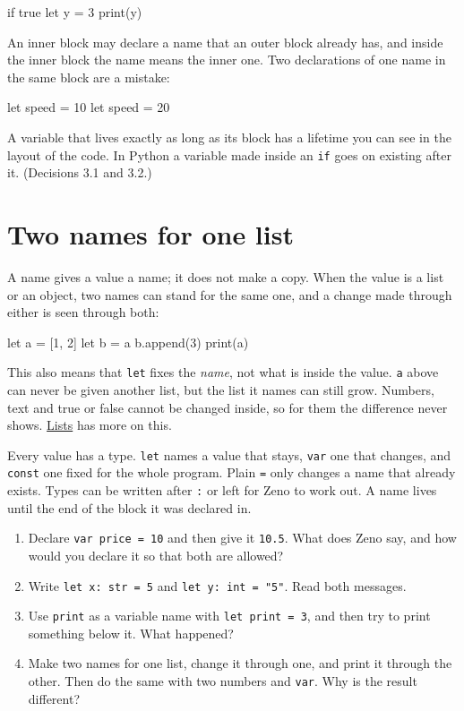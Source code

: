 \begin{zeno}[fails=yes]
if true {
    let y = 3
}
print(y)
\end{zeno}

An inner block may declare a name that an outer block already has,
and inside the inner block the name means the inner one. Two
declarations of one name in the same block are a mistake:

\begin{zeno}[fails=yes]
let speed = 10
let speed = 20
\end{zeno}

\begin{why}
A variable that lives exactly as long as its block has a lifetime you
can see in the layout of the code. In Python a variable made inside an
\verb|if| goes on existing after it. (Decisions 3.1 and 3.2.)
\end{why}

\section{Two names for one list}

A name gives a value a name; it does not make a copy. When the value
is a list or an object, two names can stand for the same one, and a
change made through either is seen through both:

\begin{zeno}
let a = [1, 2]
let b = a
b.append(3)
print(a)
\end{zeno}

This also means that \verb|let| fixes the \emph{name}, not what is
inside the value. \verb|a| above can never be given another list, but
the list it names can still grow. Numbers, text and true or false
cannot be changed inside, so for them the difference never shows.
\hyperref[ch-lists]{Lists} has more on this.

\begin{summary}
Every value has a type. \verb|let| names a value that stays,
\verb|var| one that changes, and \verb|const| one fixed for the whole
program. Plain \verb|=| only changes a name that already exists. Types
can be written after \verb|:| or left for Zeno to work out. A name
lives until the end of the block it was declared in.
\end{summary}

\begin{tryit}
\begin{enumerate}
\item Declare \verb|var price = 10| and then give it \verb|10.5|. What
  does Zeno say, and how would you declare it so that both are
  allowed?
\item Write \verb|let x: str = 5| and \verb|let y: int = "5"|. Read
  both messages.
\item Use \verb|print| as a variable name with \verb|let print = 3|,
  and then try to print something below it. What happened?
\item Make two names for one list, change it through one, and print
  it through the other. Then do the same with two numbers and
  \verb|var|. Why is the result different?
\end{enumerate}
\end{tryit}
